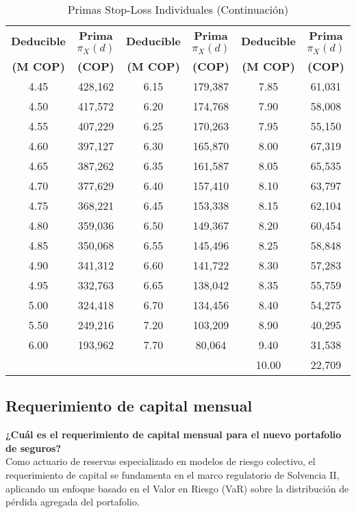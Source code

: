 \begin{table}[H]
\centering
\caption{Primas Stop-Loss Individuales (Continuación)}
\scriptsize
\begin{tabular}{cccccc}
\hline
\textbf{Deducible} & \textbf{Prima $\pi_X(d)$} & \textbf{Deducible} & \textbf{Prima $\pi_X(d)$} & \textbf{Deducible} & \textbf{Prima $\pi_X(d)$} \\
\textbf{(M COP)} & \textbf{(COP)} & \textbf{(M COP)} & \textbf{(COP)} & \textbf{(M COP)} & \textbf{(COP)} \\
\hline
4.45 & 428,162 & 6.15 & 179,387 & 7.85 & 61,031 \\
4.50 & 417,572 & 6.20 & 174,768 & 7.90 & 58,008 \\
4.55 & 407,229 & 6.25 & 170,263 & 7.95 & 55,150 \\
4.60 & 397,127 & 6.30 & 165,870 & 8.00 & 67,319 \\
4.65 & 387,262 & 6.35 & 161,587 & 8.05 & 65,535 \\
4.70 & 377,629 & 6.40 & 157,410 & 8.10 & 63,797 \\
4.75 & 368,221 & 6.45 & 153,338 & 8.15 & 62,104 \\
4.80 & 359,036 & 6.50 & 149,367 & 8.20 & 60,454 \\
4.85 & 350,068 & 6.55 & 145,496 & 8.25 & 58,848 \\
4.90 & 341,312 & 6.60 & 141,722 & 8.30 & 57,283 \\
4.95 & 332,763 & 6.65 & 138,042 & 8.35 & 55,759 \\
5.00 & 324,418 & 6.70 & 134,456 & 8.40 & 54,275 \\
5.50 & 249,216 & 7.20 & 103,209 & 8.90 & 40,295 \\
6.00 & 193,962 & 7.70 & 80,064 & 9.40 & 31,538 \\
\multicolumn{2}{|c|}{} & \multicolumn{2}{c|}{} & 10.00 & 22,709 \\
\hline
\end{tabular}
\end{table}

\subsection{Requerimiento de capital mensual}

\textbf{¿Cuál es el requerimiento de capital mensual para el nuevo portafolio de seguros?}\\

Como actuario de reservas especializado en modelos de riesgo colectivo, el requerimiento de capital se fundamenta en el marco regulatorio de Solvencia II, aplicando un enfoque basado en el Valor en Riesgo (VaR) sobre la distribución de pérdida agregada del portafolio.

